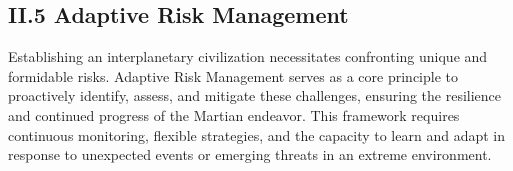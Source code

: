 \documentclass[fontsize=10pt, oneside, DIV=calc]{scrartcl}
\begin{document}
\begin{comment}
@startuml
!theme materia-outline
scale 1.6

skinparam defaultFontColor black
skinparam backgroundColor white


scale 1.6

skinparam defaultFontColor black
skinparam backgroundColor white



title ``TW Colossus\nTechnical Feasibility:\nInterconnected Systems (Simplified)''

[Martian Env.] as MarsEnv
[Energy Grid] as EnergyGrid
[Colossus AI\n(Compute)] as Colossus
[Heat Rejection] as HeatReject
[Logistics & ISRU] as Resource

EnergyGrid -down-> Colossus : ``Powers''
Colossus -down-> HeatReject : ``Generates Heat''

MarsEnv -down-> EnergyGrid : ``Challenges (Dust, Rad)''
MarsEnv -down-> HeatReject : ``Challenges (Env. Factors)''
MarsEnv -down-> Colossus : ``Challenges (via Hardware/Rad)''

Resource -right-> EnergyGrid : ``Supplies (Initial & Sustained)''
Resource -right-> Colossus : ``Supplies (Initial & Sustained)''

note left of EnergyGrid
  1 TW Cont. Power
  ~29500 km2 Solar
end note

note right of Colossus
  1 TW Compute Power
  ~714M GPUs
end note

note bottom of MarsEnv
  Requires Special Design
end note

note left of Resource
  Logistics (Initial Delivery)
  ISRU (Sustained Production)
end note

@enduml
\end{comment}




\subsection*{II.5 Adaptive Risk Management}



\medskip

\noindent
Establishing an interplanetary civilization necessitates confronting unique and formidable risks. Adaptive Risk Management serves as a core principle to proactively identify, assess, and mitigate these challenges, ensuring the resilience and continued progress of the Martian endeavor. This framework requires continuous monitoring, flexible strategies, and the capacity to learn and adapt in response to unexpected events or emerging threats in an extreme environment.
\end{document}
